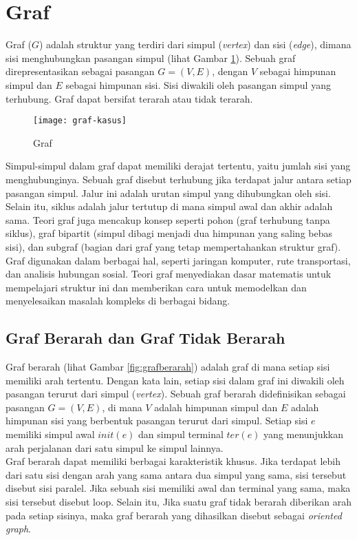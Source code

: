 \section{Graf ~\cite{Diestel:17:graph}}
\label{sec:graph}
Graf ($G$) adalah struktur yang terdiri dari simpul (\textit{vertex}) dan sisi (\textit{edge}), dimana sisi menghubungkan pasangan simpul (lihat Gambar \ref{fig:graf}). Sebuah graf direpresentasikan sebagai pasangan $G=(V,E)$, dengan $V$ sebagai himpunan simpul dan $E$ sebagai himpunan sisi. Sisi diwakili oleh pasangan simpul yang terhubung. Graf dapat bersifat terarah atau tidak terarah.
\begin{figure}[h] 
    \centering  
    \texttt{[image: graf-kasus]}  
    \caption{Graf}
    \label{fig:graf} 
\end{figure}
\noindent
Simpul-simpul dalam graf dapat memiliki derajat tertentu, yaitu jumlah sisi yang menghubunginya. Sebuah graf disebut terhubung jika terdapat jalur antara setiap pasangan simpul. Jalur ini adalah urutan simpul yang dihubungkan oleh sisi. Selain itu, siklus adalah jalur tertutup di mana simpul awal dan akhir adalah sama. Teori graf juga mencakup konsep seperti pohon (graf terhubung tanpa siklus), graf bipartit (simpul dibagi menjadi dua himpunan yang saling bebas sisi), dan subgraf (bagian dari graf yang tetap mempertahankan struktur graf).
\\
Graf digunakan dalam berbagai hal, seperti jaringan komputer, rute transportasi, dan analisis hubungan sosial. Teori graf menyediakan dasar matematis untuk mempelajari struktur ini dan memberikan cara untuk memodelkan dan menyelesaikan masalah kompleks di berbagai bidang.

\subsection{Graf Berarah dan Graf Tidak Berarah~\cite{Diestel:17:graph}}
\label{sec:grafberarah}
Graf berarah (lihat Gambar \ref{fig:grafberarah}) adalah graf di mana setiap sisi memiliki arah tertentu. Dengan kata lain, setiap sisi dalam graf ini diwakili oleh pasangan terurut dari simpul (\textit{vertex}). Sebuah graf berarah didefinisikan sebagai pasangan $G=(V,E)$, di mana $V$ adalah himpunan simpul dan $E$ adalah himpunan sisi yang berbentuk pasangan terurut dari simpul. Setiap sisi $e$ memiliki simpul awal $init(e)$ dan simpul terminal $ter(e)$ yang menunjukkan arah perjalanan dari satu simpul ke simpul lainnya.
\\
Graf berarah dapat memiliki berbagai karakteristik khusus. Jika terdapat lebih dari satu sisi dengan arah yang sama antara dua simpul yang sama, sisi tersebut disebut sisi paralel. Jika sebuah sisi memiliki awal dan terminal yang sama, maka sisi tersebut disebut loop. Selain itu, Jika suatu graf tidak berarah diberikan arah pada setiap sisinya, maka graf berarah yang dihasilkan disebut sebagai \textit{oriented graph}.

